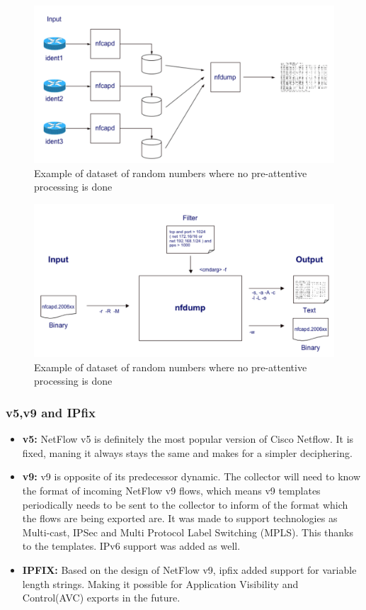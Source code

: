 \begin{figure}[h!]
\includegraphics[scale=0.4]{nfdump_operation}
\caption{Example of dataset of random numbers where no pre-attentive processing is done}
\label{nfdump_operation}
\end{figure}

\begin{figure}[h!]
\includegraphics[scale=0.4]{nfdump2}
\caption{Example of dataset of random numbers where no pre-attentive processing is done}
\label{nfdump_processing}
\end{figure}

\subsubsection{v5,v9 and IPfix}
\begin{itemize}
\item \textbf{v5:} NetFlow v5 is definitely the most popular version of Cisco Netflow. It is fixed, maning it always stays the same and makes for a simpler deciphering. 

\item \textbf{v9:} v9 is opposite of its predecessor dynamic. The collector will need to know the format of incoming NetFlow v9 flows, which means v9 templates periodically needs to be sent to the collector to inform of the format which the flows are being exported are. It was made to support technologies as Multi-cast, IPSec and Multi Protocol Label Switching (MPLS). This thanks to the templates. IPv6 support was added as well. 

\item \textbf{IPFIX:} Based on the design of NetFlow v9, \gls{ipfix} added support for variable length strings. Making it possible for Application Visibility and Control(AVC) exports in the future.
\end{itemize}

